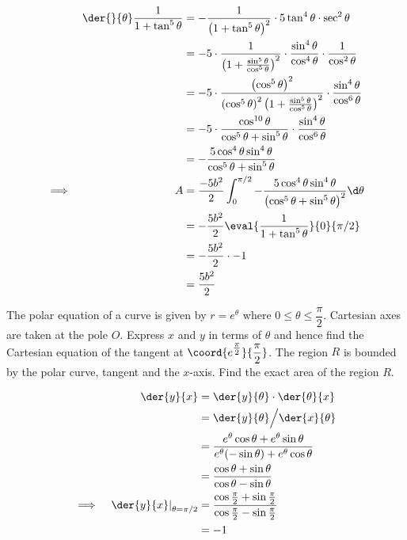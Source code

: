 \documentclass{jhwhw}
\begin{document}
        \begin{alignat*}{2}
            &&\der{}{\theta} \dfrac1{1 + \tan^5\theta} &= -\dfrac{1}{\left(1 + \tan^5\theta\right)^2} \cdot 5\tan^4\theta \cdot \sec^2\theta\\
            && &= -5 \cdot \dfrac1{\left(1 + \frac{\sin^5\theta}{\cos^5\theta}\right)^2} \cdot \dfrac{\sin^4\theta}{\cos^4\theta} \cdot \dfrac1{\cos^2\theta}\\
            && &= -5 \cdot \dfrac{\left(\cos^5\theta\right)^2}{\left(\cos^5\theta\right)^2\left(1 + \frac{\sin^5\theta}{\cos^5\theta}\right)^2} \cdot \dfrac{\sin^4\theta}{\cos^6\theta}\\
            && &= -5 \cdot \dfrac{\cos^{10}\theta}{\cos^5\theta + \sin^5\theta} \cdot \dfrac{\sin^4\theta}{\cos^6\theta}\\
            && &= -\dfrac{5\cos^4\theta\sin^4\theta}{\cos^5\theta + \sin^5\theta}\\
            \implies&&A &= \dfrac{-5b^2}2 \int_0^{\pi/2} -\dfrac{5\cos^4\theta\sin^4\theta}{\left(\cos^5\theta + \sin^5\theta\right)^2} \d \theta\\
            && &= -\dfrac{5b^2}2 \eval{\dfrac{1}{1 + \tan^5\theta}}{0}{\pi/2}\\
            && &= -\dfrac{5b^2}2 \cdot -1\\
            && &= \dfrac{5b^2}2
        \end{alignat*}


    \problem{}
        The polar equation of a curve is given by $r = e^\theta$ where $0 \leq \theta \leq \dfrac\pi2$. Cartesian axes are taken at the pole $O$. Express $x$ and $y$ in terms of $\theta$ and hence find the Cartesian equation of the tangent at $\coord{e^{\tfrac\pi2}}{\dfrac\pi2}$. The region $R$ is bounded by the polar curve, tangent and the $x$-axis. Find the exact area of the region $R$.

    \solution

        \begin{alignat*}{2}
            &&\der{y}{x} &= \der{y}{\theta} \cdot \der{\theta}{x}\\
            && &= \der{y}{\theta} \Big/ \der{x}{\theta}\\
            && &= \dfrac{e^\theta \cos\theta + e^\theta\sin\theta}{e^\theta(-\sin\theta) + e^\theta \cos\theta}\\
            && &= \dfrac{\cos\theta + \sin\theta}{\cos\theta - \sin\theta}\\
            \implies&&\left.\der{y}{x}\right|_{\theta = \pi/2} &= \dfrac{\cos\tfrac\pi2 + \sin\tfrac\pi2 }{\cos\tfrac\pi2 - \sin\tfrac\pi2 }\\
            && &= -1
        \end{alignat*}
\end{document}
